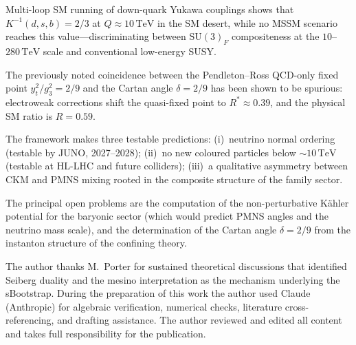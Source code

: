 \documentclass[aps,prd,twocolumn,showpacs,preprintnumbers,superscriptaddress,floatfix]{revtex4-2}
\newcommand{\SU}{\mathrm{SU}}
\newcommand{\TeV}{\,\mathrm{TeV}}
\begin{document}
Multi-loop SM running of down-quark Yukawa couplings shows that
$K^{-1}(d,s,b) = 2/3$ at $Q \approx 10\TeV$ in the SM desert,
while no MSSM scenario reaches this value---discriminating between
$\SU(3)_F$ compositeness at the $10$--$280\TeV$ scale and
conventional low-energy SUSY.

The previously noted coincidence between the Pendleton--Ross
QCD-only fixed point $y_t^2/g_3^2 = 2/9$ and the Cartan angle
$\delta = 2/9$ has been shown to be spurious: electroweak
corrections shift the quasi-fixed point to $R^* \approx 0.39$,
and the physical SM ratio is $R = 0.59$.

The framework makes three testable predictions:
(i)~neutrino normal ordering (testable by JUNO, 2027--2028);
(ii)~no new coloured particles below $\sim 10\TeV$
(testable at HL-LHC and future colliders);
(iii)~a qualitative asymmetry between CKM and PMNS mixing
rooted in the composite structure of the family sector.

The principal open problems are the computation of the
non-perturbative K\"ahler potential for the baryonic sector
(which would predict PMNS angles and the neutrino mass scale),
and the determination of the Cartan angle $\delta = 2/9$ from
the instanton structure of the confining theory.


\begin{acknowledgments}
The author thanks M.~Porter for sustained theoretical discussions
that identified Seiberg duality and the mesino interpretation as
the mechanism underlying the sBootstrap.
During the preparation of this work the author used Claude
(Anthropic) for algebraic verification, numerical checks,
literature cross-referencing, and drafting assistance.
The author reviewed and edited all content and takes full
responsibility for the publication.
\end{acknowledgments}
\end{document}
